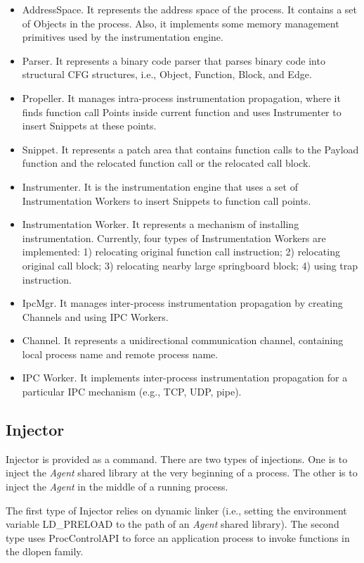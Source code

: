 \begin{itemize}
\item AddressSpace. It represents the address space of the process. It contains
  a set of Objects in the process. Also, it implements some memory management
  primitives used by the instrumentation engine.
\item Parser. It represents a binary code parser that parses binary code into
  structural CFG structures, i.e., Object, Function, Block, and Edge.
\item Propeller. It manages intra-process instrumentation propagation, where it
  finds function call Points inside current function and uses Instrumenter to
  insert Snippets at these points.
\item Snippet. It represents a patch area that contains function calls to the
  Payload function and the relocated function call or the relocated call block.
\item Instrumenter. It is the instrumentation engine that uses a set of
  Instrumentation Workers to insert Snippets to function call points.
\item Instrumentation Worker. It represents a mechanism of installing
  instrumentation. Currently, four types of Instrumentation Workers are
  implemented: 1) relocating original function call instruction; 2) relocating
  original call block; 3) relocating nearby large springboard block; 4) using
  trap instruction.
\item IpcMgr. It manages inter-process instrumentation propagation by creating
  Channels and using IPC Workers.
\item Channel. It represents a unidirectional communication channel, containing
  local process name and remote process name.
\item IPC Worker. It implements inter-process instrumentation propagation for a
  particular IPC mechanism (e.g., TCP, UDP, pipe).
\end{itemize}

\subsection{Injector}

Injector is provided as a command. 
There are two types of injections.
One is to inject the {\em Agent} shared library at the very beginning of a
process.
The other is to inject the {\em Agent} in the middle of a running process.

The first type of Injector relies on dynamic linker (i.e., setting the
environment variable LD\_PRELOAD to the path of an {\em Agent} shared library).
The second type uses ProcControlAPI to force an application process to invoke
functions in the dlopen family.
